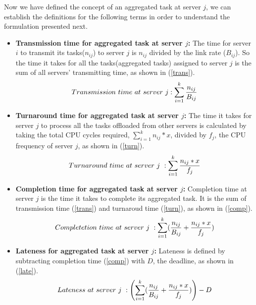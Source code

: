 Now we have defined the concept of an aggregated task at server $j$, we can establish the definitions for the following terms in order to understand the formulation presented next. 
\begin{itemize}[]
\item \textbf{Transmission time for aggregated task at server $j$:} The time for server $i$ to transmit its tasks($n_{ij}$) to server $j$ is $n_{ij}$ divided by the link rate ($B_{ij}$). So the time it takes for all the tasks(aggregated tasks) assigned to server $j$ is the sum of all servers' transmitting time, as shown in (\ref{trans}).
\begin{equation}
\small
\label{trans}
Transmission \ time \ at \ server \ j: \sum\limits_{i=1}^{k} \frac{n_{ij}}{B_{ij}}
\end{equation}


\item \textbf{Turnaround time for aggregated task at server $j$:} The time it takes for server $j$ to process all the tasks offloaded from other servers is calculated by taking the total CPU cycles required, $\sum\limits_{i=1}^{k} n_{ij}*x$, divided by $f_{j}$, the CPU frequency of server $j$, as shown in (\ref{turn}).
\begin{equation}
\small
\label{turn}
Turnaround \ time \ at \ server \ j\ : \sum\limits_{i=1}^{k} \frac{n_{ij}*x}{f_{j}}
\end{equation}

\item
\textbf{Completion time for aggregated task at server $j$:} Completion time at server $j$ is the time it takes to complete its aggregated task. It is the sum of transmission time (\ref{trans}) and turnaroud time (\ref{turn}), as shown in (\ref{comp}).
\begin{equation}
\small
\label{comp}
Completetion \ time \ at \ server \ j\ : \sum\limits_{i=1}^{k} (\frac{n_{ij}}{B_{ij}}+\frac{n_{ij}*x}{f_{j}})
\end{equation}

\item
\textbf{Lateness for aggregated task at server $j$:} Lateness is defined by subtracting completion time (\ref{comp}) with $D$, the deadline, as shown in (\ref{late}).
\begin{equation}
\small
\label{late}
Lateness \ at \ server \ j\ : \left (\sum\limits_{i=1}^{k} (\frac{n_{ij}}{B_{ij}}+\frac{n_{ij}*x}{f_{j}}) \right) - D
\end{equation}

\end{itemize}







